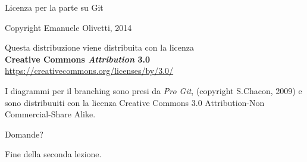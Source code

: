 \documentclass{beamer}
\begin{document}
\begin{frame}{\centerline{Licenza per la parte su Git}}
  \begin{center}
    Copyright Emanuele Olivetti, 2014
  \end{center}
  \vspace{1em}
  \begin{center}
    Questa distribuzione viene distribuita con la licenza\\
    \textbf{Creative Commons \emph{Attribution} 3.0}\\
    \url{https://creativecommons.org/licenses/by/3.0/}
  \end{center}
  \vspace{1em}
  \begin{center}\small
    I diagrammi per il branching sono presi da \emph{Pro
      Git}, (copyright S.Chacon, 2009) e sono distribuuiti con la licenza Creative Commons 3.0 Attribution-Non Commercial-Share Alike.
  \end{center}
\end{frame}


\begin{frame}
{\centerline{Domande?}}
\vspace{1cm}
\begin{center}
    \LARGE{Fine della seconda lezione.}
\end{center}

\end{frame}
\end{document}
